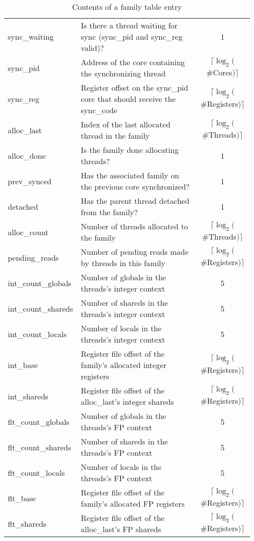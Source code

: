 \begin{table}
\begin{center}
\begin{tabularx}{\textwidth}{|l|X|c|}
sync\_waiting & Is there a thread waiting for sync (sync\_pid and sync\_reg valid)? & 1 \\
sync\_pid & Address of the core containing the synchronizing thread & $\lceil \log_2($\#Cores$)\rceil$ \\
sync\_reg & Register offset on the sync\_pid core that should receive the sync\_code & $\lceil \log_2($\#Registers$)\rceil$ \\
alloc\_last & Index of the last allocated thread in the family & $\lceil \log_2($\#Threads$)\rceil$ \\
alloc\_done & Is the family done allocating threads? & 1 \\
prev\_synced & Has the associated family on the previous core synchronized? & 1 \\
detached & Has the parent thread detached from the family? & 1 \\
alloc\_count & Number of threads allocated to the family & $\lceil \log_2($\#Threads$)\rceil$ \\
pending\_reads & Number of pending reads made by threads in this family & $\lceil \log_2($\#Registers$)\rceil$ \\
int\_count\_globals & Number of globals in the threads's integer context & 5 \\
int\_count\_shareds & Number of shareds in the threads's integer context & 5 \\
int\_count\_locals & Number of locals in the threads's integer context & 5 \\
int\_base & Register file offset of the family's allocated integer registers & $\lceil \log_2($\#Registers$)\rceil$ \\
int\_shareds & Register file offset of the alloc\_last's integer shareds & $\lceil \log_2($\#Registers$)\rceil$ \\
flt\_count\_globals & Number of globals in the threads's FP context & 5 \\
flt\_count\_shareds & Number of shareds in the threads's FP context & 5 \\
flt\_count\_locals & Number of locals in the threads's FP context & 5 \\
flt\_base & Register file offset of the family's allocated FP registers & $\lceil \log_2($\#Registers$)\rceil$ \\
flt\_shareds & Register file offset of the alloc\_last's FP shareds & $\lceil \log_2($\#Registers$)\rceil$ \\
\hline
\end{tabularx}
\caption{Contents of a family table entry}
\label{table:family_contents}
\end{center}
\end{table}

